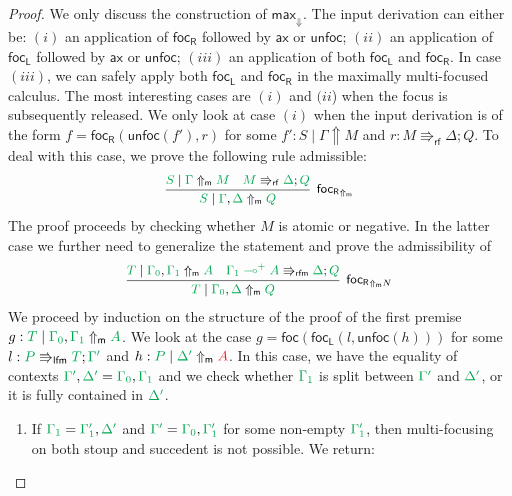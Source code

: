 \documentclass[runningheads]{llncs}
\newcommand{\ax}{\mathsf{ax}}
\newcommand{\lolli}{\multimap}
\newcommand{\lfm}{\Rrightarrow_\mathsf{lfm}}
\newcommand{\rfm}{\Rrightarrow_\mathsf{rfm}}
\newcommand{\rf}{\Rrightarrow_\mathsf{rf}}
\newcommand{\proofbox}[1]{\begin{tabular}{l} #1 \end{tabular}}
\newcommand{\red}[1]{{\color{Red}#1}}
\newcommand{\green}[1]{{\color{Green}#1}}
\newcommand{\up}{\Uparrow}
\newcommand{\dn}{\Downarrow}
\newcommand{\upm}{\Uparrow_{\mathsf{m}}}
\newcommand{\focL}{\mathsf{foc_L}}
\newcommand{\foc}{\mathsf{foc}}
\newcommand{\focR}{\mathsf{foc_R}}
\newcommand{\unfoc}{\mathsf{unfoc}}
\begin{document}
\begin{proof}
  We only discuss the construction of $\mathsf{max}_\dn$. The input derivation can either be: $(i)$ an application of $\focR$ followed by $\ax$ or $\unfoc$; $(ii)$ an application of $\focL$ followed by $\ax$ or $\unfoc$; $(iii)$ an application of both $\focL$ and $\focR$. In case $(iii)$, we can safely apply both $\focL$ and $\focR$ in the maximally multi-focused calculus. The most interesting cases are $(i)$ and $(ii$) when the focus is subsequently released. We only look at case $(i)$ when the input derivation is of the form $f = \focR(\unfoc(f'),r)$ for some $f' : S \mid \Gamma \up M$ and $r : M \rf \Delta ; Q$. To deal with this case, we prove the following rule admissible:%
  \begin{equation*}\label{eq:otmax}
    \small
    \proofbox{
    \infer[\focR_{\upm}]{\green{S} \mid \green{\Gamma},\green{\Delta} \upm \green{Q}}{
      \green{S} \mid \green{\Gamma} \upm \green{M}
      &
      \green{M} \rf \green{\Delta} ; \green{Q}
    }
    }
  \end{equation*}
  The proof proceeds by checking whether $M$ is atomic or negative. In the latter case we further need to generalize the statement and prove the admissibility of
  \begin{equation*}\label{eq:otmaxneg}
    \small
    \proofbox{
    \infer[\focR_{\upm N}]{\green{T} \mid \green{\Gamma_0},\green{\Delta} \upm \green{Q}}{
      \green{T} \mid \green{\Gamma_0},\green{\Gamma_1} \upm \green{A}
      &
      \green{\green{\Gamma_1} \lolli^+ A} \rfm \green{\Delta} ; \green{Q}
    }
    }
  \end{equation*}
  We proceed by induction on the structure of the proof of the first premise $g : \green{T} \mid \green{\Gamma_0},\green{\Gamma_1} \upm \green{A}$. We look at the case $g = \foc(\focL(l,\unfoc(h)))$ for some $l : \green{P} \lfm \green{T} ; \green{\Gamma'}$ and $h : \green{P} \mid \green{\Delta'} \upm \red{A}$. In this case, we have the equality of contexts $\green{\Gamma'},\green{\Delta'} = \green{\Gamma_0},\green{\Gamma_1}$ and we check whether $\green{\Gamma_1}$ is split between $\green{\Gamma'}$ and $\green{\Delta'}$, or it is fully contained in $\green{\Delta'}$.
  \begin{enumerate}
  \item If $\green{\Gamma_1} = \green{\Gamma_{1}'},\green{\Delta'}$ and $\green{\Gamma'} =\green{\Gamma_0},\green{\Gamma_{1}'}$ for some non-empty $\green{\Gamma_{1}'}$, then multi-focusing on both stoup and succedent is not possible. We return:

\end{enumerate}
\end{proof}
\end{document}
